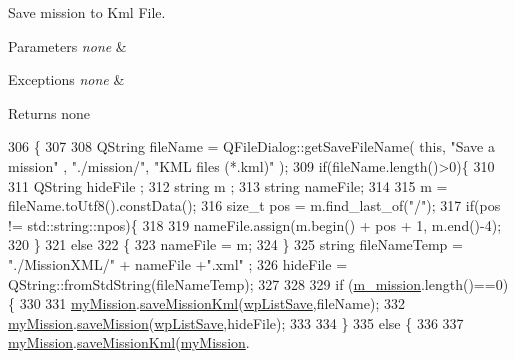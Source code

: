 Save mission to Kml File. 


\begin{DoxyParams}{Parameters}
{\em none} & \\
\hline
\end{DoxyParams}

\begin{DoxyExceptions}{Exceptions}
{\em none} & \\
\hline
\end{DoxyExceptions}
\begin{DoxyReturn}{Returns}
none 
\end{DoxyReturn}

\begin{DoxyCode}
306                        \{
307 
308     QString  fileName = QFileDialog::getSaveFileName( \textcolor{keyword}{this},  \textcolor{stringliteral}{"Save a mission"} , \textcolor{stringliteral}{"./mission/"},  \textcolor{stringliteral}{"KML files
       (*.kml)"}  );
309     \textcolor{keywordflow}{if}(fileName.length()>0)\{
310 
311         QString hideFile ;
312         \textcolor{keywordtype}{string} m ;
313         \textcolor{keywordtype}{string} nameFile;
314 
315         m = fileName.toUtf8().constData();
316         \textcolor{keywordtype}{size\_t} pos = m.find\_last\_of(\textcolor{stringliteral}{"/"});
317         \textcolor{keywordflow}{if}(pos != std::string::npos)\{
318 
319             nameFile.assign(m.begin() + pos + 1, m.end()-4);
320         \}
321           \textcolor{keywordflow}{else}
322         \{
323           nameFile = m;
324       \}
325         \textcolor{keywordtype}{string} fileNameTemp =  \textcolor{stringliteral}{"./MissionXML/"} + nameFile +\textcolor{stringliteral}{".xml"} ;
326         hideFile =  QString::fromStdString(fileNameTemp);
327 
328 
329         \textcolor{keywordflow}{if} (\hyperlink{a00008_abe44ff3e7525f2a803ac3cbce2fe7ba6}{m\_mission}.length()==0)\{
330 
331             \hyperlink{a00008_a8bd377d858dd541faf8108389a13e5ed}{myMission}.\hyperlink{a00009_a378e572221c084c413a947adec25183b}{saveMissionKml}(\hyperlink{a00008_ad11e2550a13b49086c06cf1c1dbf0a45}{wpListSave},fileName);
332             \hyperlink{a00008_a8bd377d858dd541faf8108389a13e5ed}{myMission}.\hyperlink{a00009_a4c40423028a4cfdf1bbbea8945cb696b}{saveMission}(\hyperlink{a00008_ad11e2550a13b49086c06cf1c1dbf0a45}{wpListSave},hideFile);
333 
334         \}
335         \textcolor{keywordflow}{else} \{
336 
337             \hyperlink{a00008_a8bd377d858dd541faf8108389a13e5ed}{myMission}.\hyperlink{a00009_a378e572221c084c413a947adec25183b}{saveMissionKml}(\hyperlink{a00008_a8bd377d858dd541faf8108389a13e5ed}{myMission}.

\end{DoxyCode}
